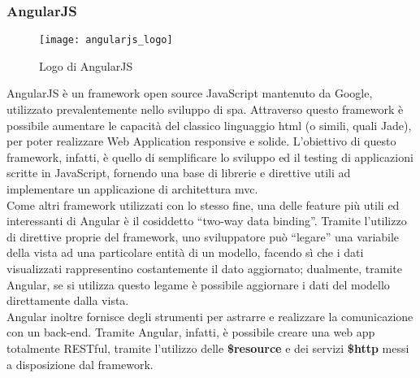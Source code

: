 \subsubsection{AngularJS}
\begin{figure}[H] 
    \centering 
    \texttt{[image: angularjs\_logo]} 
    \caption{Logo di AngularJS}
\end{figure}
AngularJS è un framework open source JavaScript mantenuto da Google, utilizzato prevalentemente nello sviluppo di \gls{spa}. Attraverso questo framework è possibile aumentare le capacità del classico linguaggio \gls{html} (o simili, quali Jade), per poter realizzare Web Application responsive e solide. 
L’obiettivo di questo framework, infatti, è quello di semplificare lo sviluppo ed il testing di applicazioni scritte in JavaScript, fornendo una base di librerie e direttive utili ad implementare un applicazione di architettura \gls{mvc}.\\
Come altri framework utilizzati con lo stesso fine, una delle feature più utili ed interessanti di Angular è il cosiddetto “two-way data binding”. Tramite l’utilizzo di direttive proprie del framework, uno sviluppatore può “legare” una variabile della vista ad una particolare entità di un modello, facendo sì che i dati visualizzati rappresentino costantemente il dato aggiornato; dualmente, tramite Angular, se si utilizza questo legame è possibile aggiornare i dati del modello direttamente dalla vista.\\
Angular inoltre fornisce degli strumenti per astrarre e realizzare la comunicazione con un back-end. Tramite Angular, infatti, è possibile creare una web app totalmente RESTful, tramite l’utilizzo delle \textbf{\$resource} e dei servizi \textbf{\$http} messi a disposizione dal framework.

